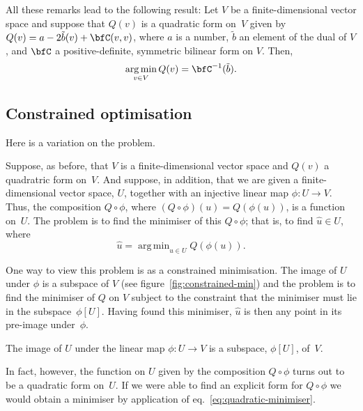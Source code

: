 \documentclass[10pt, a4paper]{article}
\DeclareMathOperator*{\argmin}{arg\,min}
\begin{document}
All these remarks lead to the following result: Let $V$ be a
finite-dimensional vector space and suppose that $Q(v)$ is a quadratic
form on~$V$ given by $Q(v)=a -2\tilde{b}(v) + \bfC(v,v)$, where
$a$ is a number, $\tilde{b}$ an element of the dual of $V$, and
$\bfC$ a positive-definite, symmetric bilinear form on $V$. Then,
\begin{equation}
  \argmin_{v\in V} Q(v) = \bfC^{-1}(\tilde{b}).
  \label{eq:quadratic-minimiser}
\end{equation}

\subsection*{Constrained optimisation}
Here is a variation on the problem.

Suppose, as before, that $V$ is a finite-dimensional vector space and
$Q(v)$ a quadratric form on~$V$. And suppose, in addition, that we are
given a finite-dimensional vector space, $U$, together with an
injective linear map $\phi:U\to V$. Thus, the composition
$Q\circ\phi$, where $(Q\circ\phi)(u)=Q(\phi(u))$, is a function
on~$U$. The problem is to find the minimiser of this $Q\circ\phi$; that is,
to find $\hat{u}\in U$, where
\begin{equation}
  \hat{u} = \argmin_{u\in U} Q(\phi(u)).
\label{eq:quadratic-minimiser}
\end{equation}

One way to view this problem is as a constrained minimisation. The
image of $U$ under $\phi$ is a subspace of $V$ (see
figure~\ref{fig:constrained-min}) and the problem is to find the
minimiser of $Q$ on $V$ subject to the constraint that the minimiser
must lie in the subspace~$\phi[U]$. Having found this minimiser,
$\hat{u}$ is then any point in its pre-image under~$\phi$.
\begin{marginfigure}
  \begin{center}
  \end{center}
  \caption{The image of $U$ under the linear map $\phi:U\to V$ is a
    subspace, $\phi[U]$, of~$V$.\label{fig:constrained-min}}
\end{marginfigure}

In fact, however, the function on $U$ given by the composition
$Q\circ\phi$ turns out to be a quadratic form on~$U$. If we were able to find
an explicit form for $Q\circ\phi$ we would obtain a minimiser by application
of eq.~\eqref{eq:quadratic-minimiser}. 
\end{document}
